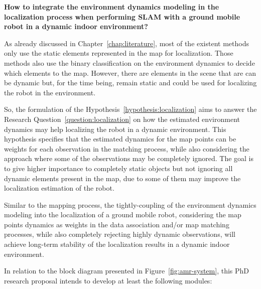 \begin{question}\label{question:localization}
\textbf{How to integrate the environment dynamics modeling in the localization process when performing \gls{SLAM} with a ground mobile robot in a dynamic indoor environment?}
\end{question}

As already discussed in Chapter~\ref{chap:literature}, most of the existent methods only use the static elements represented in the map for localization. Those methods also use the binary classification on the environment dynamics to decide which elements to the map.
However, there are elements in the scene that are can be dynamic but, for the time being, remain static and could be used for localizing the robot in the environment.

So, the formulation of the Hypothesis~\ref{hypothesis:localization} aims to answer the Research Question~\ref{question:localization} on how the estimated environment dynamics may help localizing the robot in a dynamic environment. 
This hypothesis specifies that the estimated dynamics for the map points can be weights for each observation in the matching process, while also considering the approach where some of the observations may be completely ignored. The goal is to give higher importance to completely static objects but not ignoring all dynamic elements present in the map, due to some of them may improve the localization estimation of the robot.

\begin{hypothesis}\label{hypothesis:localization}
Similar to the mapping process, the tightly-coupling of the environment dynamics modeling into the localization of a ground mobile robot, considering the map points dynamics as weights in the data association and/or map matching processes, while also completely rejecting highly dynamic observations, will achieve long-term stability of the localization results in a dynamic indoor environment.
\end{hypothesis}


In relation to the block diagram presented in Figure~\ref{fig:amr-system}, this PhD research proposal intends to develop at least the following modules:

